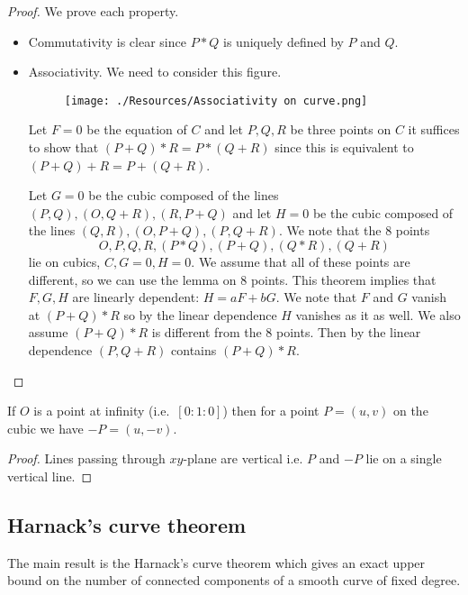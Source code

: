 \documentclass[12pt, a4paper]{article}
\begin{document}
\begin{proof}
    We prove each property.
    \begin{itemize}
        \item Commutativity is clear since \(P*Q\) is uniquely defined by \(P\) and \(Q\). 
        \item Associativity. We need to consider this figure.
        \begin{figure}[H]
             \begin{center}
                 \texttt{[image: ./Resources/Associativity on curve.png]}
             \end{center}
        \end{figure}
        Let \(F=0\) be the equation of \(C\) and let \(P,Q,R\) be three points on \(C\) it suffices to show that \((P+Q)*R=P*(Q+R)\) since this is equivalent to \((P+Q)+R=P+(Q+R)\).

        Let \(G=0\) be the cubic composed of the lines \((P,Q),(O,Q+R),(R,P+Q)\) and let \(H=0\) be the cubic composed of the lines \((Q,R),(O,P+Q),(P,Q+R)\). We note that the \(8\) points 
        \[O,P,Q,R,(P*Q),(P+Q),(Q*R),(Q+R)\]
        lie on cubics, \(C,G=0,H=0\). We assume that all of these points are different, so we can use the lemma on \(8\) points. This theorem implies that \(F,G,H\) are linearly dependent: \(H = aF + bG\). We note that \(F\) and \(G\) vanish at \((P+Q)*R\) so by the linear dependence \(H\) vanishes as it as well. We also assume \((P+Q)*R\) is different from the \(8\) points. Then by the linear dependence \((P,Q+R)\) contains \((P+Q)*R\). 
    \end{itemize}
\end{proof}

\begin{mdthm}
    If \(O\) is a point at infinity (i.e.\ \([0:1:0]\)) then for a point \(P=(u,v)\) on the cubic we have \(-P=(u,-v)\).
\end{mdthm}

\begin{proof}
    Lines passing through \(xy\)-plane are vertical i.e. \(P\) and \(-P\) lie on a single vertical line.
\end{proof}

\subsection{Harnack's curve theorem}

\begin{mdnote}
    The main result is the Harnack's curve theorem which gives an exact upper bound on the number of connected components of a smooth curve of fixed degree.
\end{mdnote}
\end{document}
